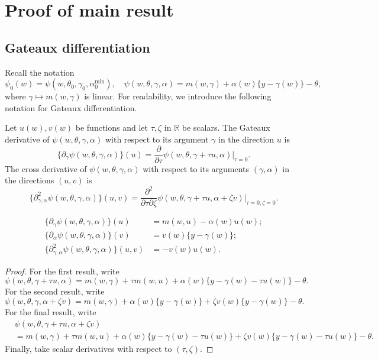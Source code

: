 \section{Proof of main result}

\subsection{Gateaux differentiation}

Recall the notation
$$
 \psi_0(w)=\psi(w,\theta_0,\gamma_0,\alpha^{\min}_0), \quad \psi(w,\theta,\gamma,\alpha)=m(w,\gamma)+\alpha(w)\{y-\gamma(w)\}-\theta,
$$
where $\gamma\mapsto m(w,\gamma)$ is linear. For readability, we introduce the following notation for Gateaux differentiation. 
\begin{definition}
Let $u(w),v(w)$ be functions and let $\tau,\zeta \text{ in }  \mathbb{R}$ be scalars. The Gateaux derivative of $\psi(w,\theta,\gamma,\alpha)$ with respect to its argument $\gamma$ in the direction $u$ is
$$
\{\partial_{\gamma} \psi(w,\theta,\gamma,\alpha)\}(u)=\frac{\partial}{\partial \tau} \psi(w,\theta,\gamma+\tau u,\alpha) \bigg|_{\tau=0}.
$$
The cross derivative of $\psi(w,\theta,\gamma,\alpha)$ with respect to its arguments $(\gamma,\alpha)$ in the directions $(u,v)$ is
$$
\{\partial^2_{\gamma,\alpha} \psi(w,\theta,\gamma,\alpha)\}(u,v)=\frac{\partial^2}{\partial \tau \partial \zeta} \psi(w,\theta,\gamma+\tau u,\alpha+\zeta v) \bigg|_{\tau=0,\zeta=0}.
$$
\end{definition}

\begin{proposition}\label{prop:deriv}
\begin{align*}
    \{\partial_{\gamma} \psi(w,\theta,\gamma,\alpha)\}(u)&=m(w,u)-\alpha(w)u(w); \\
    \{\partial_{\alpha} \psi(w,\theta,\gamma,\alpha)\}(v)&=v(w)\{y-\gamma(w)\}; \\
    \{\partial^2_{\gamma,\alpha} \psi(w,\theta,\gamma,\alpha)\}(u,v)&=-v(w)u(w).
\end{align*}
\end{proposition}

\begin{proof}
For the first result, write
$$
\psi(w,\theta,\gamma+\tau u,\alpha)=m(w,\gamma)+\tau m(w,u)+\alpha(w)\{y-\gamma(w)-\tau u(w)\}-\theta.
$$
For the second result, write
$$
\psi(w,\theta,\gamma,\alpha+\zeta v)=m(w,\gamma)+\alpha(w)\{y-\gamma(w)\}+\zeta v(w)\{y-\gamma(w)\}-\theta.
$$
For the final result, write
\begin{align*}
    &\psi(w,\theta,\gamma+\tau u,\alpha+\zeta v)\\
    &=m(w,\gamma)+\tau m(w,u)+\alpha(w)\{y-\gamma(w)-\tau u(w)\}+\zeta v(w)\{y-\gamma(w)-\tau u(w)\}-\theta.
\end{align*}
Finally, take scalar derivatives with respect to $(\tau,\zeta)$.
\end{proof}

